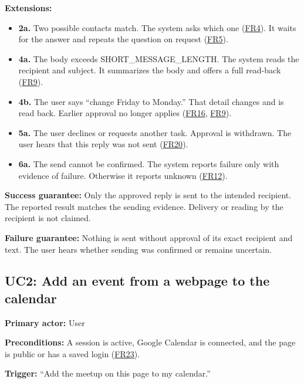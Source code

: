 \documentclass{scrreprt}
\theoremstyle{definition}
\newcommand{\reqlink}[1]{\hyperlink{req:#1}{#1}}
\begin{document}
\textbf{Extensions:}
\begin{itemize}
    \item \textbf{2a.} Two possible contacts match. The system asks which one (\reqlink{FR4}). It waits for the answer and repeats the question on request (\reqlink{FR5}).
    \item \textbf{4a.} The body exceeds SHORT\_MESSAGE\_LENGTH. The system reads the recipient and subject. It summarizes the body and offers a full read-back (\reqlink{FR9}).
    \item \textbf{4b.} The user says ``change Friday to Monday.'' That detail changes and is read back. Earlier approval no longer applies (\reqlink{FR16}, \reqlink{FR9}).
    \item \textbf{5a.} The user declines or requests another task. Approval is withdrawn. The user hears that this reply was not sent (\reqlink{FR20}).
    \item \textbf{6a.} The send cannot be confirmed. The system reports failure only with evidence of failure. Otherwise it reports unknown (\reqlink{FR12}).
\end{itemize}

\textbf{Success guarantee:} Only the approved reply is sent to the intended recipient. The reported result matches the sending evidence. Delivery or reading by the recipient is not claimed.

\textbf{Failure guarantee:} Nothing is sent without approval of its exact recipient and text. The user hears whether sending was confirmed or remains uncertain.

\subsection*{UC2: Add an event from a webpage to the calendar}

\textbf{Primary actor:} User

\textbf{Preconditions:} A session is active, Google Calendar is connected, and the page is public or has a saved login (\reqlink{FR23}).

\textbf{Trigger:} ``Add the meetup on this page to my calendar.''
\end{document}
